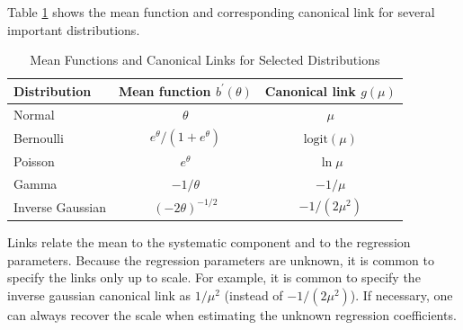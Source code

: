 
Table \ref{T13:MeanLinks} shows the mean function and corresponding
canonical link for several important distributions.

\begin{table}[h]
\caption{\label{T13:MeanLinks} Mean Functions and Canonical Links
for Selected Distributions} 
\begin{tabular}{lcc}
\hline Distribution & Mean function $b^{\prime }(\theta )$  &
Canonical link $g(\mu )$  \\ \hline
Normal & $\theta $ & $ \mu $ \\
Bernoulli & $ e^{\theta}/(1+e^{\theta} )$
& $\mathrm{logit}(\mu )$ \\
Poisson & $ e^{\theta }$ & $\ln  \mu $ \\
Gamma & $-1/\theta$ & $-1/\mu $ \\
Inverse Gaussian & $(-2 \theta )^{-1/2} $ & $-1 /(2 \mu^2) $ \\
\hline
\end{tabular}
\end{table}

\noindent Links relate the mean to the systematic component and to
the regression parameters. Because the regression parameters are
unknown, it is common to specify the links only up to scale. For
example, it is common to specify the inverse gaussian canonical link
as $1 /\mu^2$ (instead of $-1 /(2 \mu^2) $). If necessary, one can
always recover the scale when estimating the unknown regression
coefficients.


\linejed{}

